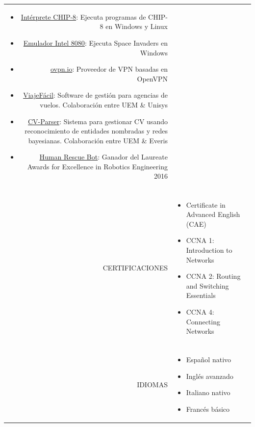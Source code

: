 \documentclass[a4paper, 11pt]{article}
\begin{document}
\begin{longtable}{rp{11cm}}
\begin{itemize}[leftmargin=0cm,label={}]
            \item \href{https://github.com/hugo19941994/CHIP8-Emu}{Intérprete CHIP-8}: Ejecuta programas de CHIP-8 en Windows y Linux
            \item \href{https://github.com/hugo19941994/SpaceInvaders-Emu}{Emulador Intel 8080}: Ejecuta Space Invaders en Windows
            \item \href{https://ovpn.io}{ovpn.io}: Proveedor de VPN basadas en OpenVPN
            \item \href{https://github.com/hugo19941994/ViajeFacil}{ViajeFácil}: Software de gestión para agencias de vuelos. Colaboración entre UEM \& Unisys
            \item \href{https://github.com/hugo19941994/CV-Parser}{CV-Parser}: Sistema para gestionar CV usando reconocimiento de entidades nombradas y redes bayesianas. Colaboración entre UEM \& Everis
            \item \href{https://github.com/hugo19941994/robot}{Human Rescue Bot}: Ganador del Laureate Awards for Excellence in Robotics Engineering 2016
        \end{itemize}\\
        \\
        CERTIFICACIONES
        & \vspace{-8mm}
        \begin{itemize}[leftmargin=0cm,label={},noitemsep]
            \item Certificate in Advanced English (CAE)
            \item CCNA 1: Introduction to Networks
            \item CCNA 2: Routing and Switching Essentials
            \item CCNA 4: Connecting Networks
        \end{itemize}\\
        \\
        IDIOMAS
        & \vspace{-8mm}
        \begin{itemize}[leftmargin=0cm,label={},noitemsep]
            \item Español nativo
            \item Inglés avanzado
            \item Italiano nativo
            \item Francés básico
        \end{itemize}
    \end{longtable}
\end{document}
